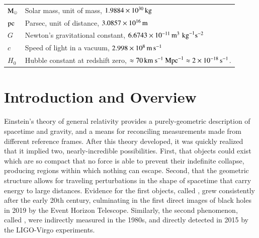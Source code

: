 \documentclass[onecolumn,authoryear]{els-mrw}
\begin{document}
    \begin{glossary}
    \begin{tabular}{@{}lp{34pc}@{}}
    $\textrm{M}_{\odot}$ & Solar mass, unit of mass, $1.9884\times\nobreak10^{30} \, \mathrm{kg}$ \\
    $\mathrm{pc}$ & Parsec, unit of distance, $3.0857\times\nobreak10^{16} \, \mathrm{m}$ \\
    $G$ & Newton's gravitational constant, $6.6743\times\nobreak10^{{-11}} \, \mathrm{m}^3 \, \, \mathrm{kg}^{-1} \mathrm{s}^{-2}$ \\
    $c$ & Speed of light in a vacuum, $2.998\times\nobreak10^{8} \, \mathrm{m} \, \mathrm{s}^{-1}$ \\
    $H_0$ & Hubble constant at redshift zero, $\approx 70 \, \textrm{km}~\textrm{s}^{-1}~\textrm{Mpc}^{-1} \approx 2\times\nobreak10^{-18} \, \mathrm{s}^{-1}$.
    \end{tabular}
    \end{glossary}







\section{Introduction and Overview}\label{sec:intro}

Einstein's theory of general relativity provides a purely-geometric description of spacetime and gravity, and a means for reconciling measurements made from different reference frames.  After this theory developed, it was quickly realized that it implied two, nearly-incredible possibilities.  First, that objects could exist which are so compact that no force is able to prevent their indefinite collapse, producing regions within which nothing can escape.  Second, that the geometric structure allows for traveling perturbations in the shape of spacetime that carry energy to large distances.  Evidence for the first objects, called , grew consistently after the early 20th century, culminating in the first direct images of black holes in 2019 by the Event Horizon Telescope.  Similarly, the second phenomenon, called , were indirectly measured in the 1980s, and directly detected in 2015 by the LIGO-Virgo experiments.
\end{document}
